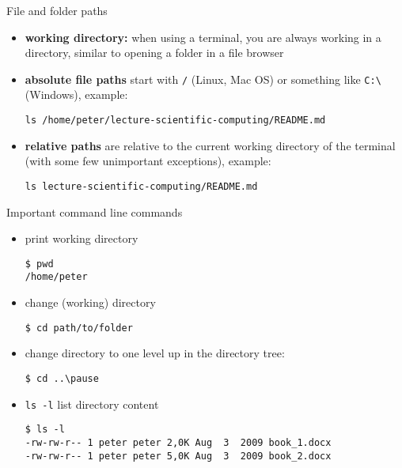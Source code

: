 \begin{frame}[fragile]{File and folder paths}
    \begin{itemize}
        \item {\bf working directory:} when using a terminal, you are always working in a
            directory, similar to opening a folder in a file browser\pause
        \item {\bf absolute file paths} start with \verb|/| (Linux, Mac OS) or something like \verb|C:\|
            (Windows), example:
            {\small
            \begin{verbatim}ls /home/peter/lecture-scientific-computing/README.md\end{verbatim}}\pause
        \item {\bf relative paths} are relative to the current working directory of the terminal (with some few unimportant exceptions), example:
            {\small
            \begin{verbatim}ls lecture-scientific-computing/README.md\end{verbatim}}
    \end{itemize}

\end{frame}

\begin{frame}[fragile]{Important command line commands}
    \begin{itemize}
        \item print working directory
\begin{verbatim}$ pwd
/home/peter
\end{verbatim}\pause
        \item change (working) directory
\begin{verbatim}$ cd path/to/folder\end{verbatim}\pause
        \item change directory to one level up in the directory tree:
\begin{verbatim}$ cd ..\pause\end{verbatim}\pause
        \item \verb|ls -l| list directory content
\begin{verbatim}$ ls -l
-rw-rw-r-- 1 peter peter 2,0K Aug  3  2009 book_1.docx
-rw-rw-r-- 1 peter peter 5,0K Aug  3  2009 book_2.docx
\end{verbatim}
    \end{itemize}
\end{frame}


